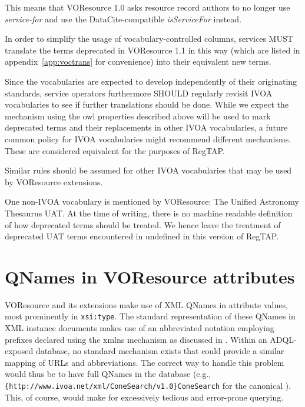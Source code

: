 \documentclass[11pt,a4paper]{ivoa}
\begin{document}
This means that VOResource 1.0 asks resource record authors to no longer
use \emph{service-for} and use the DataCite-compatible
\emph{isServiceFor} instead.

In order to simplify the usage of vocabulary-controlled columns,
services MUST translate the terms deprecated in VOResource 1.1 in this
way (which are listed in appendix~\ref{app:voctrans} for convenience)
into their equivalent new terms.

Since the vocabularies are expected to develop independently of their
originating standards, service operators furthermore SHOULD regularly
revisit IVOA vocabularies to see if further translations should be done.
While we expect the mechanism using the owl properties described above
will be used to mark deprecated terms and their replacements in other
IVOA vocabularies, a future common policy for IVOA vocabularies might
recommend different mechanisms. These are considered equivalent for the
purposes of RegTAP.

Similar rules should be assumed for other IVOA vocabularies that may be
used by VOResource extensions.

One non-IVOA vocabulary is mentioned by VOResource: The Unified
Astronomy Thesaurus UAT.  At the time of writing, there is no machine
readable definition of how deprecated terms should be treated.  We
hence leave the treatment of deprecated UAT terms encountered in
 undefined in this version of RegTAP.


\section{QNames in VOResource attributes}

\label{qnameatts}

VOResource and its extensions make use of XML QNames in attribute
values, most prominently in \texttt{xsi:type}.  The standard
representation of these QNames in XML instance documents makes use of an
abbreviated notation employing prefixes declared using the xmlns mechanism
as discussed in \citet{std:XMLNS}.  Within an ADQL-exposed database, no
standard mechanism exists that could provide a similar mapping of URLs
and abbreviations.  The correct way to handle this problem would thus be
to have full QNames in the database (e.g.,
\verb|{http://www.ivoa.net/xml/ConeSearch/v1.0}ConeSearch| for the
canonical ).  This, of course, would make for
excessively tedious and error-prone querying.
\end{document}
